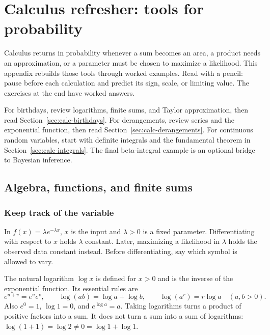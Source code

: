 \chapter[Calculus refresher]{Calculus refresher: tools for probability}
\label{app:calculus}

Calculus returns in probability whenever a sum becomes an area, a product
needs an approximation, or a parameter must be chosen to maximize a
likelihood. This appendix rebuilds those tools through worked examples.
Read with a pencil: pause before each calculation and predict its sign,
scale, or limiting value. The exercises at the end have worked answers.

\begin{bigidea}[title={Choose a route through the refresher}]
For birthdays, review logarithms, finite sums, and Taylor approximation,
then read Section~\ref{sec:calc-birthdays}. For derangements, review
series and the exponential function, then read
Section~\ref{sec:calc-derangements}. For continuous random variables,
start with definite integrals and the fundamental theorem in
Section~\ref{sec:calc-integrals}. The final beta-integral example is an
optional bridge to Bayesian inference.
\end{bigidea}

\section{Algebra, functions, and finite sums}

\subsection*{Keep track of the variable}
In $f(x)=\lambda e^{-\lambda x}$, $x$ is the input and $\lambda>0$ is a
fixed parameter. Differentiating with respect to $x$ holds $\lambda$
constant. Later, maximizing a likelihood in $\lambda$ holds the observed
data constant instead. Before differentiating, say which symbol is allowed
to vary.

The natural logarithm $\log x$ is defined for $x>0$ and is the inverse
of the exponential function. Its essential rules are
\[
 e^{u+v}=e^u e^v,\qquad
 \log(ab)=\log a+\log b,\qquad
 \log(a^r)=r\log a\quad(a,b>0).
\]
Also $e^0=1$, $\log1=0$, and $e^{\log a}=a$.
Taking logarithms turns a product of positive factors into a sum.
It does not turn a sum into a sum of logarithms:
$\log(1+1)=\log2\ne0=\log1+\log1$.

